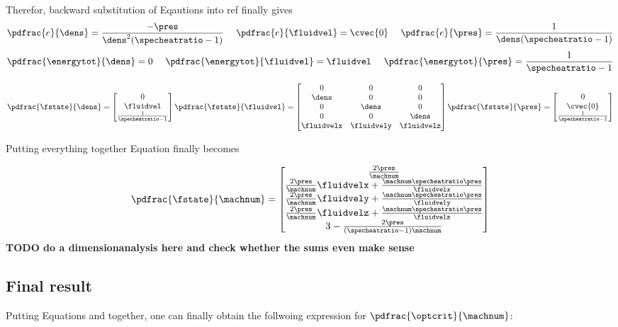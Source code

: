 \documentclass[../main.tex]{subfiles}
\begin{document}
Therefor, backward substitution of Eqautions \REF into ref finally gives
\begin{align}
\pdfrac{e}{\dens}    =\frac{-\pres}{\dens^2 (\specheatratio-1)} ~~~~
\pdfrac{e}{\fluidvel}=\cvec{0}                                  ~~~~
\pdfrac{e}{\pres}    =\frac{1}{\dens (\specheatratio-1)}
\end{align}
\begin{align}
\pdfrac{\energytot}{\dens}    =0                            ~~~~
\pdfrac{\energytot}{\fluidvel}=\fluidvel                    ~~~~
\pdfrac{\energytot}{\pres}    =\frac{1}{\specheatratio-1}
\end{align}

\begin{align}
\pdfrac{\fstate}{\dens}    =\begin{bmatrix} 0 \\ \fluidvel \\ \frac{1}{\specheatratio-1} \end{bmatrix}
\pdfrac{\fstate}{\fluidvel}=\begin{bmatrix}
                              0     & 0     & 0   \\
                              \dens & 0     & 0   \\
                              0     & \dens & 0   \\
                              0     & 0     & \dens \\
                              \fluidvelx & \fluidvely & \fluidvelz
                            \end{bmatrix}
\pdfrac{\fstate}{\pres}    =\begin{bmatrix} 0 \\ \cvec{0} \\ \frac{1}{\specheatratio-1} \end{bmatrix}
\end{align}



\vspace{2cm}






Putting everything together Equation \REF finally becomes


\begin{align}
\pdfrac{\fstate}{\machnum}=
\begin{bmatrix}
\frac{2\pres}{\machnum} \\
\frac{2\pres}{\machnum}\fluidvelx+\frac{\machnum\specheatratio\pres}{\fluidvelx} \\
\frac{2\pres}{\machnum}\fluidvely+\frac{\machnum\specheatratio\pres}{\fluidvely} \\
\frac{2\pres}{\machnum}\fluidvelz+\frac{\machnum\specheatratio\pres}{\fluidvelz} \\
3-\frac{2\pres}{(\specheatratio-1)\machnum}
\end{bmatrix}
\end{align}
\textbf{TODO do a dimensionanalysis here and check whether the sums even make sense}



\subsection{Final result}
Putting Equations \REF and \REF together, one can finally obtain the follwoing expression for $\pdfrac{\optcrit}{\machnum}$:
\end{document}
